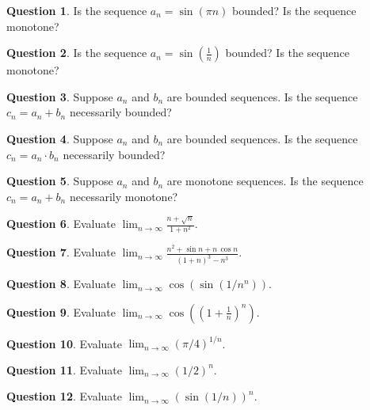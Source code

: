 \documentclass[12pt]{article}
\theoremstyle{definition}
\newtheorem{question}{Question}
\newcommand{\limn}{\displaystyle\lim_{n \to \infty}}
\begin{document}
\begin{question}
Is the sequence $a_n = \sin (\pi n)$ bounded?  Is the sequence monotone?
\end{question}

\begin{question}
Is the sequence $a_n = \sin \left( \frac{1}{n} \right)$ bounded?  Is the sequence monotone?
\end{question}

\begin{question}
Suppose $a_n$ and $b_n$ are bounded sequences.  Is the sequence $c_n = a_n + b_n$ necessarily bounded?
\end{question}

\begin{question}
Suppose $a_n$ and $b_n$ are bounded sequences.  Is the sequence $c_n = a_n \cdot b_n$ necessarily bounded?
\end{question}

\begin{question}
Suppose $a_n$ and $b_n$ are monotone sequences.  Is the sequence $c_n = a_n + b_n$ necessarily monotone?
\end{question}

\begin{question}
Evaluate $\limn \frac{n + \sqrt{n}}{1+n^2}$.
\end{question}

\begin{question}
Evaluate $\limn \frac{n^2 + \sin n + n \, \cos n}{(1+n)^3 - n^3}$.
\end{question}

\begin{question}
Evaluate $\limn \cos\left( \sin \left( 1/n^n \right) \right)$.
\end{question}

\begin{question}
Evaluate $\limn \cos \left( \left( 1 + \displaystyle\frac{1}{n} \right)^n \right)$.
\end{question}

\begin{question}
Evaluate $\limn (\pi/4)^{1/n}$.
\end{question}

\begin{question}
Evaluate $\limn \left(1/2\right)^n$.
\end{question}

\begin{question}
Evaluate $\limn \left(\sin (1/n)\right)^n$.
\end{question}
\end{document}
